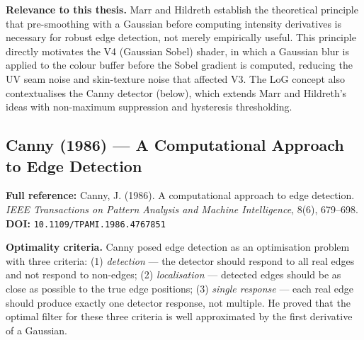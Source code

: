 \documentclass[11pt, a4paper]{article}
\begin{document}
\textbf{Relevance to this thesis.} Marr and Hildreth establish the theoretical principle that pre-smoothing with a Gaussian before computing intensity derivatives is necessary for robust edge detection, not merely empirically useful. This principle directly motivates the V4 (Gaussian Sobel) shader, in which a Gaussian blur is applied to the colour buffer before the Sobel gradient is computed, reducing the UV seam noise and skin-texture noise that affected V3. The LoG concept also contextualises the Canny detector (below), which extends Marr and Hildreth's ideas with non-maximum suppression and hysteresis thresholding.

\vspace{8pt}
\subsection{Canny (1986) --- A Computational Approach to Edge Detection}

\begin{refbox}
\textbf{Full reference:} Canny, J. (1986). A computational approach to edge detection. \textit{IEEE Transactions on Pattern Analysis and Machine Intelligence}, 8(6), 679--698.\\[4pt]
\textbf{DOI:} \texttt{10.1109/TPAMI.1986.4767851}
\end{refbox}

\textbf{Optimality criteria.} Canny posed edge detection as an optimisation problem with three criteria: (1) \textit{detection} --- the detector should respond to all real edges and not respond to non-edges; (2) \textit{localisation} --- detected edges should be as close as possible to the true edge positions; (3) \textit{single response} --- each real edge should produce exactly one detector response, not multiple. He proved that the optimal filter for these three criteria is well approximated by the first derivative of a Gaussian.
\end{document}
